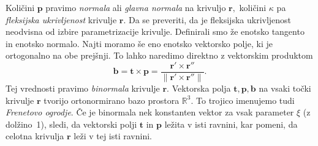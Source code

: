 \documentclass[12pt,a4paper,twoside]{article}
\theoremstyle{definition} %
\theoremstyle{plain} %
\numberwithin{equation}{section}  %
\newcommand{\R}{\mathbb R}
\newcommand{\tV}{\mathbf{t}}
\newcommand{\bV}{\mathbf{b}}
\newcommand{\pV}{\mathbf{p}}
\newcommand{\rV}{\mathbf{r}}
\begin{document}
Količini $\pV$ pravimo \textit{normala} ali \textit{glavna normala} na krivuljo $\rV,$ količini $\kappa$ pa \textit{fleksijska ukrivljenost} krivulje $\rV.$ Da se preveriti, da je fleksijska ukrivljenost neodvisna od izbire parametrizacije krivulje.
Definirali smo že enotsko tangento in enotsko normalo. Najti moramo še eno enotsko vektorsko polje, ki je ortogonalno na obe prejšnji. To lahko naredimo direktno z vektorskim produktom
\begin{equation}
	\label{binormala}
	\bV=\tV \times \pV=\frac{\rV'\times \rV''}{\lVert \rV'\times \rV'' \rVert}.
\end{equation}
Tej vrednosti pravimo \textit{binormala} krivulje $\rV.$ Vektorska polja $\tV,\mathbf{ p}, \mathbf{ b}$ na vsaki točki krivulje $\rV$ tvorijo ortonormirano bazo prostora $\R^3.$ To trojico imenujemo tudi \textit{Frenetovo ogrodje}. Če je binormala nek konstanten vektor za vsak parameter $\xi$ (z dolžino~1), sledi, da vektorski polji $\tV$ in $\pV$ ležita v isti ravnini, kar pomeni, da celotna krivulja $\rV$ leži v tej isti ravnini.
\end{document}
